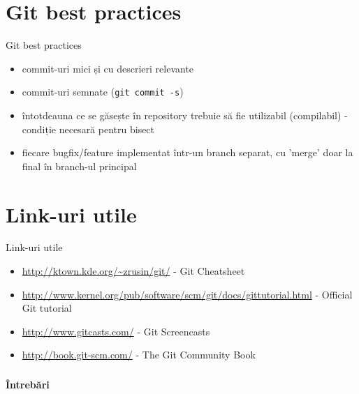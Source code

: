 \documentclass{beamer}
\begin{document}
\section{Git best practices}
\frame{\tableofcontents[currentsection]}
\begin{frame}{Git best practices}
\begin{itemize} %
\item commit-uri mici și cu descrieri relevante
\item commit-uri semnate (\texttt{git commit -s})
\item întotdeauna ce se găsește în repository trebuie să fie utilizabil (compilabil) - condiție necesară pentru bisect
\item fiecare bugfix/feature implementat într-un branch separat, cu 'merge' doar la final în branch-ul principal
\end{itemize}
\end{frame}

\section{Link-uri utile}
\frame{\tableofcontents[currentsection]}
\begin{frame}{Link-uri utile}
\begin{itemize} %
\item \url{http://ktown.kde.org/~zrusin/git/} - Git Cheatsheet
\item \url{http://www.kernel.org/pub/software/scm/git/docs/gittutorial.html} - Official Git tutorial
\item \url{http://www.gitcasts.com/} - Git Screencasts
\item \url{http://book.git-scm.com/} - The Git Community Book
\end{itemize}
\end{frame}



\begin{frame}
  \frametitle{}
  \begin{center}
    {\Huge \bfseries Întrebări}
  \end{center}
\end{frame}
\end{document}
